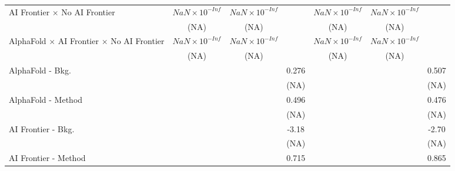 \begin{tabular}{lcccccc}
   AI Frontier $\times$ No AI Frontier                                        & $NaN\times 10^{-Inf}$  & $NaN\times 10^{-Inf}$  &                        & $NaN\times 10^{-Inf}$  & $NaN\times 10^{-Inf}$  &   \\   
                                                                              & (NA)                   & (NA)                   &                        & (NA)                   & (NA)                   &   \\   
   AlphaFold $\times$ AI Frontier $\times$ No AI Frontier                     & $NaN\times 10^{-Inf}$  & $NaN\times 10^{-Inf}$  &                        & $NaN\times 10^{-Inf}$  & $NaN\times 10^{-Inf}$  &   \\   
                                                                              & (NA)                   & (NA)                   &                        & (NA)                   & (NA)                   &   \\   
   AlphaFold - Bkg.                                                           &                        &                        & 0.276                  &                        &                        & 0.507\\   
                                                                              &                        &                        & (NA)                   &                        &                        & (NA)\\   
   AlphaFold - Method                                                         &                        &                        & 0.496                  &                        &                        & 0.476\\   
                                                                              &                        &                        & (NA)                   &                        &                        & (NA)\\   
   AI Frontier - Bkg.                                                         &                        &                        & -3.18                  &                        &                        & -2.70\\   
                                                                              &                        &                        & (NA)                   &                        &                        & (NA)\\   
   AI Frontier - Method                                                       &                        &                        & 0.715                  &                        &                        & 0.865\\   

\end{tabular}
